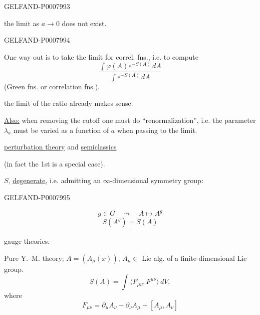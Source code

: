 \begin{GelfandAdjacentEvidence}{GELFAND-P000799}{3}


 the limit as \(a\to0\) does not exist.
\end{GelfandAdjacentEvidence}
\begin{GelfandAdjacentEvidence}{GELFAND-P000799}{4}


One way out is to take the limit for correl. fns., i.e. to compute
\begin{equation*}
\frac{\int\varphi(A)e^{-S(A)}\,dA}{\int e^{-S(A)}\,dA}
\tag{2}
\end{equation*}
(Green fns. or correlation fns.).

 the limit of the ratio already makes sense.

\underline{Also:} when removing the cutoff one must do “renormalization”, i.e. the parameter \(\lambda_a\) must be varied as a function of \(a\) when passing to the limit.


\underline{perturbation theory} and \underline{semiclassics}

(in fact the 1st is a special case).

 \(S\), 
\underline{\underline{degenerate}},
i.e. admitting an \(\infty\)-dimensional symmetry group:
\end{GelfandAdjacentEvidence}
\begin{GelfandAdjacentEvidence}{GELFAND-P000799}{5}

\[
g\in G\quad\leadsto\quad A\mapsto A^g
\]
\begin{equation*}
\underline{S(A^g)=S(A)}
\tag{3}
\end{equation*}

 gauge theories.

Pure Y.–M. theory; \(A=(A_\mu(x))\), \(A_\mu\in\) Lie alg. of a finite-dimensional Lie group.
\begin{equation*}
S(A)=\int\langle F_{\mu\nu},F^{\mu\nu}\rangle\,dV,
\tag{4}
\end{equation*}
where
\begin{equation*}
F_{\mu\nu}=\partial_\mu A_\nu-\partial_\nu A_\mu+[A_\mu,A_\nu]
\tag{5}
\end{equation*}
\end{GelfandAdjacentEvidence}



